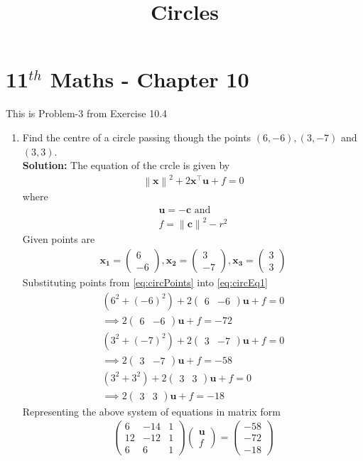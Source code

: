 \documentclass[12pt]{article}
\providecommand{\brak}[1]{\ensuremath{\left(#1\right)}}
\newcommand{\solution}{\noindent \textbf{Solution: }}
\newcommand{\myvec}[1]{\ensuremath{\begin{pmatrix}#1\end{pmatrix}}}
\let\vec\mathbf
\providecommand{\norm}[1]{\left\lVert#1\right\rVert}
\let\vec\mathbf
\begin{document}
\begin{center}
\title{\textbf{Circles}}
\date{\vspace{-5ex}} %
\maketitle
\end{center}
\setcounter{page}{1}

\section{11$^{th}$ Maths - Chapter 10}
This is Problem-3 from Exercise 10.4
\begin{enumerate}
\item Find the centre of a circle passing though the points $(6,-6), (3,-7)$ and $(3,3)$. \\ 
\solution 
The equation of the crcle is given by 
\begin{align}
	\label{eq:circEq1}
	\norm{\vec{x}}^2+2\vec{x}^\top\vec{u}+f = 0 
\end{align}
where
\begin{align}
	\vec{u} = -\vec{c} \text{ and } \\
        \label{eq:fRelation}
	f = \norm{\vec{c}}^2 - r^2
\end{align}
Given points are 
\begin{align}
	\label{eq:circPoints}
     \vec{x_1} = \myvec{6 \\ -6} , \vec{x_2} = \myvec{3 \\-7}, \vec{x_3}= \myvec{3 \\ 3}
\end{align}
Substituting points from \eqref{eq:circPoints} into \eqref{eq:circEq1}
\begin{align}
	\brak{6^2 + \brak{-6}^2}+2\myvec{6 & -6}\vec{u}+f = 0 \\ 
	\implies 2\myvec{6 & -6}\vec{u} + f = -72 \\ 
	\brak{3^2 + \brak{-7}^2}+2\myvec{3 & -7}\vec{u}+f = 0 \\ 
	\implies 2\myvec{3 & -7}\vec{u} + f = -58 \\
	\brak{3^2 + 3^2}+2\myvec{3 & 3}\vec{u}+f = 0 \\ 
	\implies 2\myvec{3 & 3}\vec{u} + f = -18 
\end{align}
Representing the above system of equations in matrix form
\begin{align}
 \myvec{6 & -14 & 1 \\
	12 & -12 & 1 \\
	6 & 6 & 1
	} \myvec {\vec{u} \\
	           f 
		}  = \myvec{-58 \\ -72 \\ -18 }
\end{align}


\end{enumerate}
\end{document}
